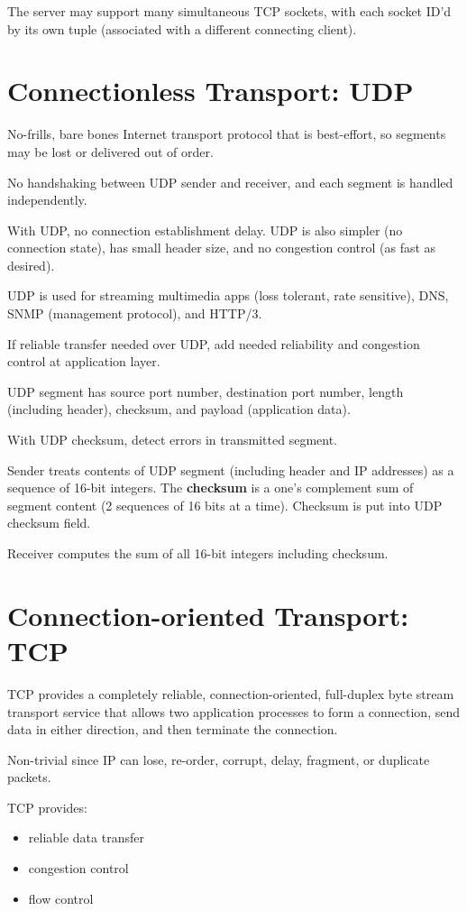 \documentclass[11pt]{article}
\begin{document}
The server may support many simultaneous TCP sockets, with each socket ID'd by
its own tuple (associated with a different connecting client).
\section{Connectionless Transport: UDP}
\label{sec:orga8ea09a}
No-frills, bare bones Internet transport protocol that is best-effort, so segments
may be lost or delivered out of order.

No handshaking between UDP sender and receiver, and each segment is handled
independently.

With UDP, no connection establishment delay.
UDP is also simpler (no connection state), has small header size,
and no congestion control (as fast as desired).

UDP is used for streaming multimedia apps (loss tolerant, rate sensitive), DNS,
SNMP (management protocol), and HTTP/3.

If reliable transfer needed over UDP, add needed reliability and congestion control
at application layer.

UDP segment has source port number, destination port number, length (including header),
checksum, and payload (application data).

With UDP checksum, detect errors in transmitted segment.

Sender treats contents of UDP segment (including header and IP addresses) as a sequence
of 16-bit integers.
The \textbf{checksum} is a one's complement sum of segment content (2 sequences of 16 bits
at a time).
Checksum is put into UDP checksum field.

Receiver computes the sum of all 16-bit integers including checksum.
\section{Connection-oriented Transport: TCP}
\label{sec:org1b9c9d6}
TCP provides a completely reliable, connection-oriented, full-duplex byte stream transport service
that allows two application processes to form a connection, send data in either direction, and
then terminate the connection.

Non-trivial since IP can lose, re-order, corrupt, delay, fragment, or duplicate packets.

TCP provides:
\begin{itemize}
\item reliable data transfer
\item congestion control
\item flow control
\end{itemize}
\end{document}
